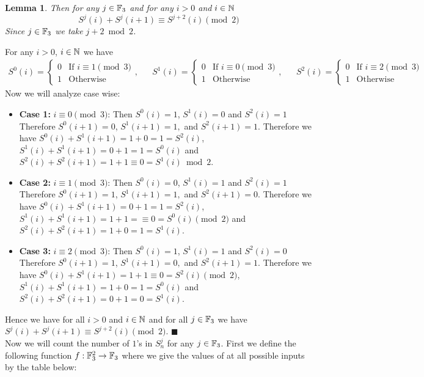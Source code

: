 \documentclass[a4paper, 11pt]{article}
\newtheorem{lemma}{Lemma}
\renewenvironment{proof}{\noindent{\it \textbf{Proof:}}\hspace*{1em}}{\hfill $\blacksquare$\bigskip\\}
\begin{document}
{\begin{lemma}\label{p3lm2}
Then for any $j\in\mathbb{F}_3$ and for any $i>0$ and $i\in\mathbb{N}$ $$S^j(i)+S^j(i+1)\equiv S^{j+2}(i)\pmod 2$$Since $j\in\mathbb{F}_3$ we take $j+2\bmod 2$. 
\end{lemma}
\begin{proof}
	For any $i>0$, $i\in\mathbb{N}$ we have  \begin{align*}
		S^0(i)=\begin{cases}
			0 & \text{If $i\equiv 1\pmod 3$}\\
			1 & \text{Otherwise}
		\end{cases}, && S^1(i)=\begin{cases}
		0 & \text{If $i\equiv 0\pmod 3$}\\
		1 & \text{Otherwise}
	\end{cases}, &&S^2(i)=\begin{cases}
	0 & \text{If $i\equiv 2\pmod 3$}\\
	1 & \text{Otherwise}
\end{cases} 
	\end{align*}
Now we will analyze case wise:\begin{itemize}
	\item \textbf{Case 1:} $i\equiv 0\pmod 3$: Then $S^0(i)=1$, $ S^1(i)=0$ and $ S^{2}(i)=1$ Therefore $S^0(i+1)=0$, $S^1(i+1)=1,$ and $ S^{2}(i+1)=1$. Therefore we have $S^0(i)+S^1(i+1)=1+0=1=S^2(i)$, $S^1(i)+S^1(i+1)=0+1=1=S^0(i)$ and $S^2(i)+S^2(i+1)=1+1\equiv 0=S^1(i)\bmod 2$.
	\item \textbf{Case 2:} $i\equiv 1\pmod 3$: Then $S^0(i)=0$, $ S^1(i)=1$ and $ S^{2}(i)=1$ Therefore $S^0(i+1)=1$, $S^1(i+1)=1,$ and $ S^{2}(i+1)=0$. Therefore we have $S^0(i)+S^1(i+1)=0+1=1=S^2(i)$, $S^1(i)+S^1(i+1)=1+1=\equiv 0=S^0(i)\pmod 2$ and $S^2(i)+S^2(i+1)=1+0=1=S^1(i)$.
	\item \textbf{Case 3:} $i\equiv 2\pmod 3$: Then $S^0(i)=1$, $ S^1(i)=1$ and $ S^{2}(i)=0$ Therefore $S^0(i+1)=1$, $S^1(i+1)=0,$ and $ S^{2}(i+1)=1$. Therefore we have $S^0(i)+S^1(i+1)=1+1\equiv 0=S^2(i)\pmod 2$, $S^1(i)+S^1(i+1)=1+0=1=S^0(i)$ and $S^2(i)+S^2(i+1)=0+1= 0=S^1(i)$.
\end{itemize}Hence we have for all $i>0$ and $i\in\mathbb{N}$ and for all $j\in\mathbb{F}_3$ we have $S^j(i)+S^j(i+1)\equiv S^{j+2}(i)\pmod 2$. 
\end{proof}Now we will count the number of $1$'s in $S^j_n$ for any $j\in\mathbb{F}_3$. First we define the following function $f:\mathbb{F}_3^2\to\mathbb{F}_3$ where we give the values of at all possible inputs by the table below:

}
\end{document}
